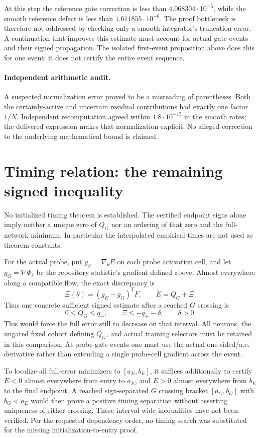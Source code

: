 \documentclass[10pt]{article}
\begin{document}
At this step the reference gate correction is less than
$4.068304\cdot10^{-5}$, while the smooth reference defect is less than
$1.611855\cdot10^{-6}$. The proof bottleneck is therefore not addressed
by checking only a smooth integrator's truncation error. A continuation
that improves this estimate must account for actual gate events and their
signed propagation. The isolated first-event proposition above does this
for one event; it does not certify the entire event sequence.

\paragraph{Independent arithmetic audit.}
A suspected normalization error proved to be a misreading of parentheses.
Both the certainly-active and uncertain residual contributions had exactly
one factor $1/N$. Independent recomputation agreed within
$1.8\cdot10^{-15}$ in the smooth rates; the delivered expression makes
that normalization explicit. No alleged correction to the underlying
mathematical bound is claimed.

\section{Timing relation: the remaining signed inequality}
No initialized timing theorem is established. The certified endpoint signs
alone imply neither a unique zero of $Q_G$ nor an ordering of that zero and
the full-network minimum. In particular the interpolated empirical times
are not used as theorem constants.

For the actual probe, put $g_E=\nabla_\theta E$ on each probe activation cell,
and let $g_G=\nabla\Phi_I$ be the repository statistic's gradient defined
above. Almost everywhere along a compatible flow, the exact discrepancy is
\[
 \Xi(\theta)=(g_E-g_G)^TF,\qquad \dot E=Q_G+\Xi.
\]
Thus one concrete sufficient signed estimate after a reached $G$ crossing is
\begin{equation}\label{initcert:timing-missing}
 0\le Q_G\le q_+,
 \qquad \Xi\le-q_+-\delta,\qquad \delta>0.
\end{equation}
This would force the full error still to decrease on that interval. All
neurons, the ungated fixed cohort defining $Q_G$, and actual training
selectors must be retained in this comparison. At probe-gate events one
must use the actual one-sided/a.e. derivative rather than extending a
single probe-cell gradient across the event.

To localize all full-error minimizers to $[a_E,b_E]$, it suffices additionally
to certify $\dot E<0$ almost everywhere from entry to $a_E$, and
$\dot E>0$ almost everywhere from $b_E$ to the final endpoint. A reached
sign-separated $G$ crossing bracket $[a_G,b_G]$ with $b_G<a_E$ would then
prove a positive timing separation without asserting uniqueness of either
crossing. These interval-wide inequalities have not been verified.
Per the requested dependency order, no timing search was substituted for
the missing initialization-to-entry proof.
\end{document}
